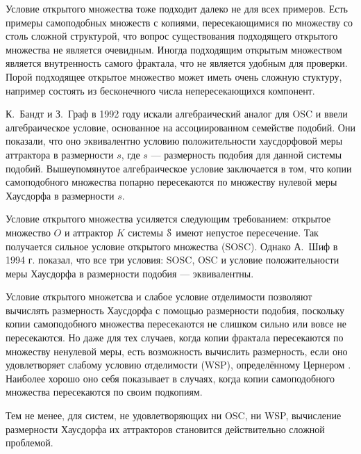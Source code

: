 Условие открытого множества тоже подходит далеко не для всех примеров.
Есть примеры самоподобных множеств с копиями, пересекающимися по множеству со столь сложной структурой, что вопрос существования подходящего открытого множества не является очевидным.
Иногда подходящим открытым множеством является внутренность самого фрактала, что не является удобным для проверки. 
Порой подходящее открытое множество может иметь очень сложную стуктуру, например состоять из бесконечного числа непересекающихся компонент.

К.~Бандт и З.~Граф в 1992 году \cite{SSS7} искали алгебраический аналог для OSC и ввели алгебраическое условие, основанное на ассоциированном семействе подобий. 
Они показали, что оно эквивалентно условию положительности хаусдорфовой меры аттрактора в размерности $s$, где $s$ --- размерность подобия для данной системы подобий.
Вышеупомянутое алгебраическое условие заключается в том, что копии самоподобного множества попарно пересекаются по множеству нулевой меры Хаусдорфа в размерности $s$.

Условие открытого множества усиляется  следующим требованием: открытое множество $O$ и аттрактор $K$ системы ${\EuScript S}$ имеют непустое пересечение. 
Так получается сильное условие открытого множества (SOSC).
Однако А.~Шиф \cite{Schi} в 1994 г. показал, что все три условия: SOSC, OSC и условие положительности меры Хаусдорфа в размерности подобия --- эквивалентны.

Условие открытого множетсва и слабое условие отделимости позволяют вычислять размерность Хаусдорфа с помощью размерности подобия, поскольку копии самоподобного множества пересекаются не слишком сильно или вовсе не пересекаются.
Но даже для тех случаев, когда копии фрактала пересекаются по множеству ненулевой меры, есть возможность вычислить размерность, если оно удовлетворяет  слабому условию отделимости (WSP), определённому Цернером \cite{Zerner}.
Наиболее хорошо оно себя показывает в случаях, когда копии самоподобного множества пересекаются по своим подкопиям.

Тем не менее, для систем, не удовлетворяющих ни OSC, ни WSP, вычисление размерности Хаусдорфа их аттракторов становится действительно сложной проблемой.\\

